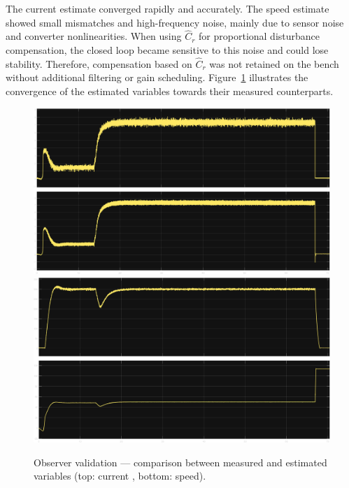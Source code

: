 \documentclass{rapportCS}
\begin{document}
The current estimate converged rapidly and accurately. 
The speed estimate showed small mismatches and high-frequency noise, mainly due to sensor noise and converter nonlinearities. 
When using $\hat C_r$ for proportional disturbance compensation, the closed loop became sensitive to this noise and could lose stability. 
Therefore, compensation based on $\hat C_r$ was not retained on the bench without additional filtering or gain scheduling. 
Figure~\ref{fig:exp_obs_results} illustrates the convergence of the estimated variables towards their measured counterparts.

\begin{figure}[H]
    \centering
    \includegraphics[width=\linewidth, keepaspectratio]{figures/p3i.png}
    \vspace{0.5em}
    \includegraphics[width=\linewidth, keepaspectratio]{figures/pw.png}
    \caption{Observer validation --- comparison between measured and estimated variables (top: current , bottom: speed).}
    \label{fig:exp_obs_results}
\end{figure}


\newpage
\end{document}
